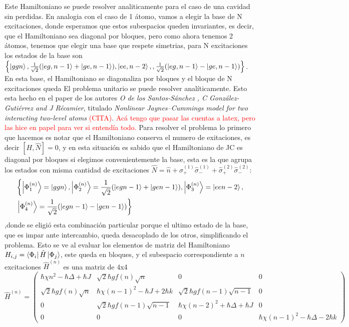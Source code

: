 Este Hamiltoniano se puede resolver analiticamente para el caso de una cavidad sin perdidas. En analogia con el caso de 1 átomo, vamos a elegir la base de N excitaciones, donde esperamos que estos subespacios queden invariantes, es decir, que el Hamiltoniano sea diagonal por bloques, pero como ahora tenemos 2 átomos, tenemos que elegir una base que respete simetrias, para N excitaciones los estados de la base son $\left\{\ket{ggn},\frac{1}{\sqrt{2}}(\ket{eg,n-1}+\ket{ge,n-1}),\ket{ee,n-2},,\frac{1}{\sqrt{2}}(\ket{eg,n-1}-\ket{ge,n-1})\right\}$. En esta base, el Hamiltoniano se diagonaliza por bloques y el bloque de N excitaciones queda
El problema unitario se puede resolver analíticamente. Esto esta hecho en el paper de los autores \textit{O de los Santos-Sánchez
, C González-Gutiérrez and J Récamier}, titulado \textit{Nonlinear Jaynes–Cummings model for two
interacting two-level atoms} \cite{paper:santos}\textcolor{red}{(CITA)}. 
\textcolor{red}{Ac\'a tengo que pasar las cuentas a latex, pero las hice en papel para ver si entend\'ia todo.}
Para resolver el problema lo primero que hacemos es notar que el Hamiltoniano conserva el numero de exitaciones, es decir $[H,\hat N]=0$, y en esta situación es sabido que el Hamiltoniano de JC es diagonal por bloques si elegimos convenientemente la base, esta es la que agrupa los estados con misma cantidad de excitaciones $\hat N = \hat n + \hat \sigma_+^{(1)}\hat \sigma_-^{(1)}+\hat \sigma_+^{(2)}\hat \sigma_-^{(2)}$: 
\begin{equation}
\begin{split}
    & \left\{\ket{\Phi^{(n)}_1}=\ket{ggn},\ket{\Phi^{(n)}_2}=\frac{1}{\sqrt{2}}(\ket{egn-1}+\ket{gen-1}),\ket{\Phi^{(n)}_3}=\ket{een-2},\right. \\
& \left. \ket{\Phi^{(n)}_4}=\frac{1}{\sqrt{2}}(\ket{egn-1}-\ket{gen-1})\right\} 
\end{split}
\end{equation}
,donde se eligi\'o esta combinaci\'on particular porque el ultimo estado de la base, que es impar ante intercambio, queda desacoplado de los otros, simplificando el problema. Esto se ve al evaluar los elementos de matriz del Hamiltoniano $H_{i,j}=\bra{\Phi_i}\hat H \ket{\Phi_j}$, este queda en bloques, y el subespacio correspondiente a $n$ excitaciones $\hat H^{(n)}$ es una matriz de 4x4
\begin{equation}
    \hat H^{(n)} = 
    \begin{pmatrix}
    \hbar \chi n^2 - \hbar \Delta + \hbar J & \sqrt{2}\hbar g f(n)\sqrt{n} & 0 & 0 \\
    \sqrt{2}\hbar g f(n)\sqrt{n} & \hbar \chi (n-1)^2  - \hbar J + 2\hbar k & \sqrt{2}\hbar g f(n-1)\sqrt{n-1} & 0 \\
    0 & \sqrt{2}\hbar g f(n-1)\sqrt{n-1} & \hbar \chi (n-2)^2 + \hbar \Delta + \hbar J & 0 \\
    0&0&0&\hbar \chi (n-1)^2 - \hbar \Delta - 2\hbar k
    \end{pmatrix}
\end{equation}
